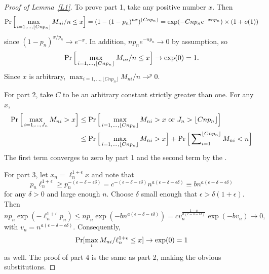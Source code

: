 \documentclass[11pt]{article}
\begin{document}
\begin{proof}[Proof of Lemma~\ref{L1}]
  To prove part 1, take any positive number $x$. Then
  \begin{equation*}
    \operatorname{Pr}\Big[\max_{i=1,\dots, \lfloor C n p_n \rfloor} M_{ni}/n \leq x \Big]
    = (1 - (1 - p_n)^{n x})^{\lfloor C n p_n \rfloor}
    = \exp(-C n p_n e^{-x n p_n}) \times (1 + o(1))
  \end{equation*}
  since $(1 - p_n)^{x/p_n} \to e^{-x}$. In addition, $n p_n e^{-n p_n} \to 0$
  by assumption, so
  \begin{align*}
    \operatorname{Pr}\Big[\max_{i=1,\dots, \lfloor C n p_n \rfloor} M_{ni}/n \leq x \Big]
    \to \exp(0) = 1.
  \end{align*}
  Since $x$ is arbitrary, $\max_{i=1,\dots,\lfloor C n p_n \rfloor} M_{ni} / n \to^p 0$.

  For part 2, take $C$ to be an arbitrary constant strictly greater
  than one. For any $x$,
  \begin{align*}
    \operatorname{Pr}\Big[\max_{i=1,\dots,J_n} M_{ni} > x\Big] & \leq
    \operatorname{Pr}\Big[\max_{i=1,\dots,\lfloor C n p_n \rfloor} M_{ni} > x
    \text{\ or\ } J_n > \lfloor C n p_n \rfloor\Big] \\
    & \leq \operatorname{Pr}\Big[\max_{i=1,\dots,\lfloor C n p_n \rfloor} M_{ni} > x\Big]
    + \operatorname{Pr}\Big[\sum\nolimits_{i=1}^{\lfloor C n
      p_n \rfloor} M_{ni} < n \Big]
  \end{align*}
  The first term converges to zero by part 1 and the second term by
  the \lln.

  For part 3, let $x_n = \ell_n^{1 + \epsilon} x$ and note that
  \begin{equation*}
    p_n \ell_n^{1+\epsilon} \geq p_n^{-(\epsilon-\delta-\epsilon\delta)} =
    c^{-(\epsilon-\delta-\epsilon\delta)}
    n^{a(\epsilon-\delta-\epsilon\delta)} \equiv b n^{a(\epsilon
      - \delta - \epsilon\delta)}
  \end{equation*}
  for any $\delta > 0$ and large enough $n$.  Choose $\delta$ small
  enough that $\epsilon > \delta(1 +\epsilon)$. Then
  \begin{equation*}
    n p_n \exp(-\ell_n^{1+\epsilon} p_n) \leq n p_n
    \exp(-b n^{a(\epsilon -
      \delta - \epsilon\delta)}) = c
    v_n^{\frac{1-a}{a(\epsilon-\delta-\epsilon\delta)}}
    \exp(-b v_n) \to 0,
  \end{equation*}
  with $v_n = n^{a(\epsilon-\delta-\epsilon\delta)}$.  Consequently,
  \begin{equation*}
    \operatorname{Pr}[\max_i M_{ni}/\ell_n^{1+\epsilon} \leq x ] \to \exp(0) = 1
  \end{equation*}
  as well.
  The proof of part 4 is the same as part 2, making the obvious
  substitutions.


\end{proof}
\end{document}
